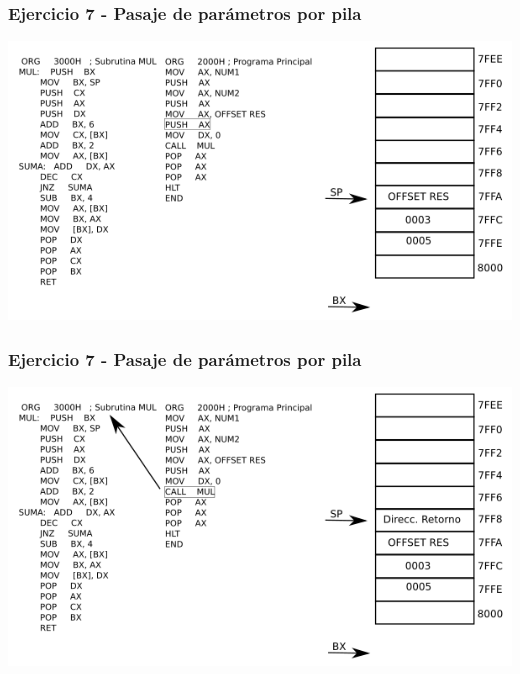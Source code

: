\documentclass{beamer}
\begin{document}
\begin{frame}
\frametitle{Ejercicio 7 - Pasaje de parámetros por pila}
\includegraphics[scale=0.70]{imgs/imagen_004.png}
\end{frame}

\begin{frame}
\frametitle{Ejercicio 7 - Pasaje de parámetros por pila}
\includegraphics[scale=0.70]{imgs/imagen_005.png}
\end{frame}
\end{document}
